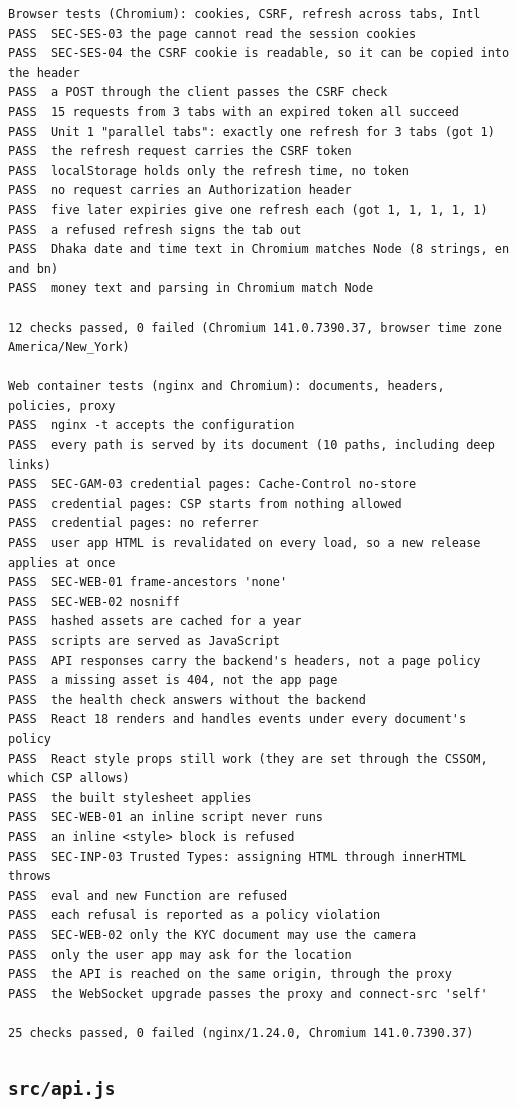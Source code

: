 \documentclass[11pt,a4paper]{article}
\begin{document}
{\begin{verbatim}
Browser tests (Chromium): cookies, CSRF, refresh across tabs, Intl
PASS  SEC-SES-03 the page cannot read the session cookies
PASS  SEC-SES-04 the CSRF cookie is readable, so it can be copied into the header
PASS  a POST through the client passes the CSRF check
PASS  15 requests from 3 tabs with an expired token all succeed
PASS  Unit 1 "parallel tabs": exactly one refresh for 3 tabs (got 1)
PASS  the refresh request carries the CSRF token
PASS  localStorage holds only the refresh time, no token
PASS  no request carries an Authorization header
PASS  five later expiries give one refresh each (got 1, 1, 1, 1, 1)
PASS  a refused refresh signs the tab out
PASS  Dhaka date and time text in Chromium matches Node (8 strings, en and bn)
PASS  money text and parsing in Chromium match Node

12 checks passed, 0 failed (Chromium 141.0.7390.37, browser time zone America/New_York)

Web container tests (nginx and Chromium): documents, headers, policies, proxy
PASS  nginx -t accepts the configuration
PASS  every path is served by its document (10 paths, including deep links)
PASS  SEC-GAM-03 credential pages: Cache-Control no-store
PASS  credential pages: CSP starts from nothing allowed
PASS  credential pages: no referrer
PASS  user app HTML is revalidated on every load, so a new release applies at once
PASS  SEC-WEB-01 frame-ancestors 'none'
PASS  SEC-WEB-02 nosniff
PASS  hashed assets are cached for a year
PASS  scripts are served as JavaScript
PASS  API responses carry the backend's headers, not a page policy
PASS  a missing asset is 404, not the app page
PASS  the health check answers without the backend
PASS  React 18 renders and handles events under every document's policy
PASS  React style props still work (they are set through the CSSOM, which CSP allows)
PASS  the built stylesheet applies
PASS  SEC-WEB-01 an inline script never runs
PASS  an inline <style> block is refused
PASS  SEC-INP-03 Trusted Types: assigning HTML through innerHTML throws
PASS  eval and new Function are refused
PASS  each refusal is reported as a policy violation
PASS  SEC-WEB-02 only the KYC document may use the camera
PASS  only the user app may ask for the location
PASS  the API is reached on the same origin, through the proxy
PASS  the WebSocket upgrade passes the proxy and connect-src 'self'

25 checks passed, 0 failed (nginx/1.24.0, Chromium 141.0.7390.37)
\end{verbatim}
}

\subsection{\texttt{src/api.js}}

\end{document}
